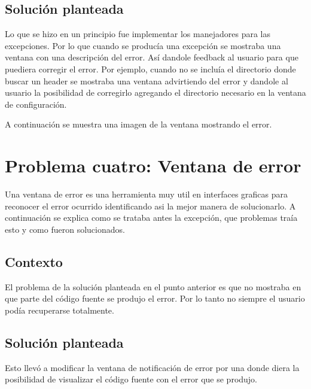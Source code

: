 \documentclass[a4paper,oneside,10pt]{article}
\begin{document}
\subsection{Soluci\'on planteada}
Lo que se hizo en un principio fue implementar los manejadores para las excepciones. Por lo que cuando se produc\'ia una excepci\'on se mostraba una ventana con una descripci\'on del error. As\'i dandole feedback al usuario para que puediera corregir el error. Por ejemplo, cuando no se inclu\'ia el directorio donde buscar un header se mostraba una ventana advirtiendo del error y dandole al usuario la posibilidad de corregirlo agregando el directorio necesario en la ventana de configuraci\'on.

A continuación se muestra una imagen de la ventana mostrando el error.

\section{Problema cuatro: Ventana de error}

Una ventana de error es una herramienta muy util en interfaces graficas para reconocer el error ocurrido identificando asi la mejor manera de solucionarlo.
A continuaci\'on se explica como se trataba antes la excepci\'on, que problemas tra\'ia esto y como fueron solucionados.

\subsection{Contexto}
El problema de la soluci\'on planteada en el punto anterior es que no mostraba en que parte del c\'odigo fuente se produjo el error. Por lo tanto no siempre el usuario pod\'ia recuperarse totalmente.

\subsection{Soluci\'on planteada}
Esto llev\'o a modificar la ventana de notificaci\'on de error por una donde diera la posibilidad de visualizar el c\'odigo fuente con el error que se produjo. 
\end{document}
